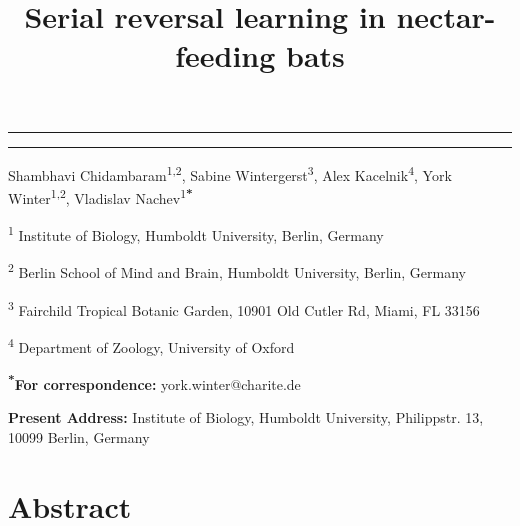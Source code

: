\documentclass[
]{article}
\title{Serial reversal learning in nectar-feeding bats}
\author{}
\date{\vspace{-2.5em}}
\begin{document}
\maketitle

\begin{center}\rule{0.5\linewidth}{0.5pt}\end{center}

\begin{center}\rule{0.5\linewidth}{0.5pt}\end{center}

Shambhavi Chidambaram\textsuperscript{1,2}, Sabine Wintergerst\textsuperscript{3}, Alex Kacelnik\textsuperscript{4}, York Winter\textsuperscript{1,2}, Vladislav Nachev\textsuperscript{1\textbf{*}}

\textsuperscript{1} Institute of Biology, Humboldt University, Berlin, Germany

\textsuperscript{2} Berlin School of Mind and Brain, Humboldt University, Berlin, Germany

\textsuperscript{3} Fairchild Tropical Botanic Garden, 10901 Old Cutler Rd, Miami, FL 33156

\textsuperscript{4} Department of Zoology, University of Oxford

\textsuperscript{\textbf{*}}\textbf{For correspondence:} york.winter@charite.de

\textbf{Present Address:} Institute of Biology, Humboldt University, Philippstr. 13, 10099 Berlin, Germany

\hypertarget{abstract}{%
\section{Abstract}\label{abstract}}
\end{document}

